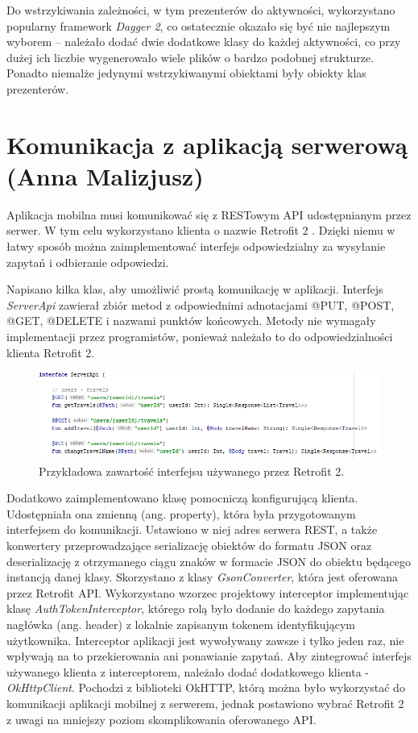 \documentclass[10pt,twoside,a4paper]{report}
\begin{document}
\par Do wstrzykiwania zależności, w tym prezenterów do aktywności, wykorzystano popularny framework \textit{Dagger 2}\cite{Dagger 2}, co ostatecznie okazało się być nie najlepszym wyborem – należało dodać dwie dodatkowe klasy do każdej aktywności, co przy dużej ich liczbie wygenerowało wiele plików o bardzo podobnej strukturze. Ponadto niemalże jedynymi wstrzykiwanymi obiektami były obiekty klas prezenterów. 

\section{Komunikacja z aplikacją serwerową (Anna Malizjusz)}
\par Aplikacja mobilna musi komunikować się z RESTowym API udostępnianym przez serwer. W tym celu wykorzystano klienta o nazwie Retrofit 2 \cite{Retrofit library}. Dzięki niemu w łatwy sposób można zaimplementować interfejs odpowiedzialny za wysyłanie zapytań i odbieranie odpowiedzi.

\par Napisano kilka klas, aby umożliwić prostą komunikację w aplikacji. Interfejs \textit{ServerApi} zawierał zbiór metod z odpowiednimi adnotacjami @PUT, @POST, @GET, @DELETE i nazwami punktów końcowych. Metody nie wymagały implementacji przez programistów, ponieważ należało to do odpowiedzialności klienta Retrofit 2.

\begin{figure}[h]
\centering
\includegraphics[width=\linewidth]{serverApi}
\caption{Przykładowa zawartość interfejsu używanego przez Retrofit 2.}
\label{fig:tokenPayload}
\end{figure}

\par Dodatkowo zaimplementowano klasę pomocniczą konfigurującą klienta. Udostępniała ona zmienną (ang. property), która była przygotowanym interfejsem do komunikacji. Ustawiono w niej adres serwera REST, a także konwertery przeprowadzające serializację obiektów do formatu JSON oraz deserializację z otrzymanego ciągu znaków w formacie JSON do obiektu będącego instancją danej klasy. Skorzystano z klasy \textit{GsonConverter}, która jest oferowana przez Retrofit API. Wykorzystano wzorzec projektowy interceptor implementując klasę \textit{AuthTokenInterceptor}, którego rolą było dodanie do każdego zapytania nagłówka (ang. header) z lokalnie zapisanym tokenem identyfikującym użytkownika. Interceptor aplikacji jest wywoływany zawsze i tylko jeden raz, nie wpływają na to przekierowania ani ponawianie zapytań. Aby zintegrować interfejs używanego klienta z interceptorem, należało dodać dodatkowego klienta - \textit{OkHttpClient}\cite{OkHttpClient}. Pochodzi z biblioteki OkHTTP, którą można było wykorzystać do komunikacji aplikacji mobilnej z serwerem, jednak postawiono wybrać Retrofit 2 z uwagi na mniejszy poziom skomplikowania oferowanego API.
\end{document}
